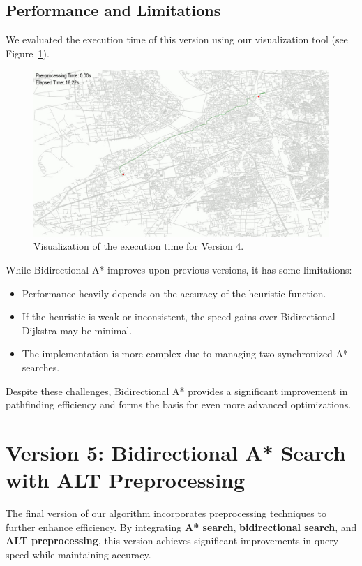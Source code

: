 	\subsection{Performance and Limitations}
	
	We evaluated the execution time of this version using our visualization tool (see Figure~\ref{fig:bidirectional_astar_timing}).
	
	\begin{figure}[h]
		\centering
		\includegraphics[width=1.0\textwidth]{bidirectional_astar.png}
		\caption{Visualization of the execution time for Version 4.}
		\label{fig:bidirectional_astar_timing}
	\end{figure}
	
	While Bidirectional A* improves upon previous versions, it has some limitations:
	\begin{itemize}
		\item Performance heavily depends on the accuracy of the heuristic function.
		\item If the heuristic is weak or inconsistent, the speed gains over Bidirectional Dijkstra may be minimal.
		\item The implementation is more complex due to managing two synchronized A* searches.
	\end{itemize}
	
	Despite these challenges, Bidirectional A* provides a significant improvement in pathfinding efficiency and forms the basis for even more advanced optimizations.
	
	\section{Version 5: Bidirectional A* Search with ALT Preprocessing}
	
	The final version of our algorithm incorporates preprocessing techniques to further enhance efficiency. By integrating \textbf{A* search}, \textbf{bidirectional search}, and \textbf{ALT preprocessing}, this version achieves significant improvements in query speed while maintaining accuracy.


